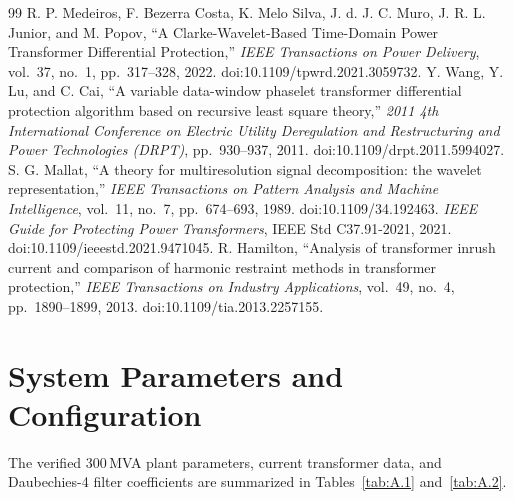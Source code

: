 \documentclass[12pt,a4paper,oneside]{report}
\begin{document}
\begin{thebibliography}{99}
 R. P. Medeiros, F. Bezerra Costa, K. Melo Silva, J. d. J. C. Muro, J. R. L. Junior, and M. Popov, ``A Clarke-Wavelet-Based Time-Domain Power Transformer Differential Protection,'' \textit{IEEE Transactions on Power Delivery}, vol.~37, no.~1, pp.~317--328, 2022. doi:10.1109/tpwrd.2021.3059732.
 Y. Wang, Y. Lu, and C. Cai, ``A variable data-window phaselet transformer differential protection algorithm based on recursive least square theory,'' \textit{2011 4th International Conference on Electric Utility Deregulation and Restructuring and Power Technologies (DRPT)}, pp.~930--937, 2011. doi:10.1109/drpt.2011.5994027.
 S. G. Mallat, ``A theory for multiresolution signal decomposition: the wavelet representation,'' \textit{IEEE Transactions on Pattern Analysis and Machine Intelligence}, vol.~11, no.~7, pp.~674--693, 1989. doi:10.1109/34.192463.
 \textit{IEEE Guide for Protecting Power Transformers}, IEEE Std C37.91-2021, 2021. doi:10.1109/ieeestd.2021.9471045.
 R. Hamilton, ``Analysis of transformer inrush current and comparison of harmonic restraint methods in transformer protection,'' \textit{IEEE Transactions on Industry Applications}, vol.~49, no.~4, pp.~1890--1899, 2013. doi:10.1109/tia.2013.2257155.
\end{thebibliography}

\appendix
\renewcommand{\thechapter}{\Alph{chapter}}
\titleformat{\chapter}[display]{\centering\normalfont\bfseries}{\Large APPENDIX \thechapter}{6pt}{\Large\MakeUppercase}
\chapter{System Parameters and Configuration}
The verified 300\,MVA plant parameters, current transformer data, and Daubechies-4 filter coefficients are summarized in Tables~\ref{tab:A.1} and~\ref{tab:A.2}.
\end{document}
